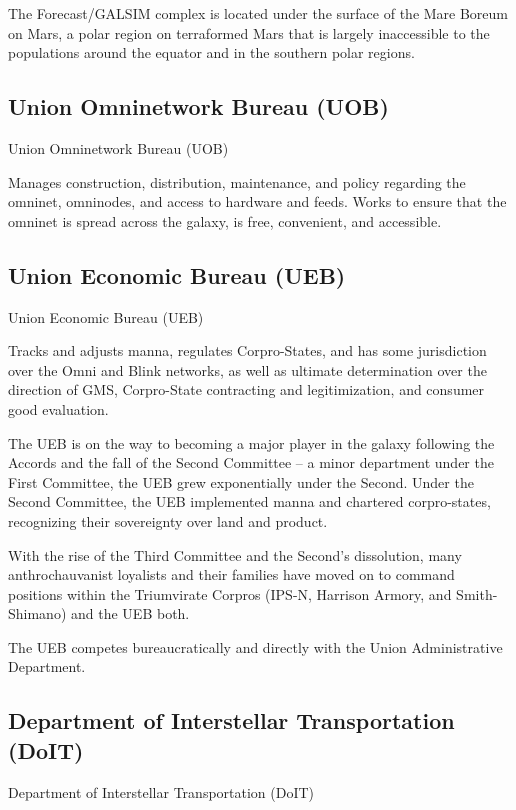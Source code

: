 The Forecast/GALSIM complex is located under the surface of the Mare Boreum on Mars, a  
polar region on terraformed Mars that is largely inaccessible to the populations around the  
equator and in the southern polar regions.  
 
\subsection{Union Omninetwork Bureau (UOB)}
Union Omninetwork Bureau (UOB)   

Manages construction, distribution, maintenance, and policy regarding the omninet, omninodes,  
and access to hardware and feeds. Works to ensure that the omninet is spread across the  
galaxy, is free, convenient, and accessible. 
 
 
\subsection{Union Economic Bureau (UEB) }

Union Economic Bureau (UEB)  

Tracks and adjusts manna, regulates Corpro-States, and has some jurisdiction over the Omni  
and Blink networks, as well as ultimate determination over the direction of GMS, Corpro-State  
contracting and legitimization, and consumer good evaluation.  
 

The UEB is on the way to becoming a major player in the galaxy following the Accords and the  
fall of the Second Committee -- a minor department under the First Committee, the UEB grew  
exponentially under the Second. Under the Second Committee, the UEB implemented manna  
and chartered corpro-states, recognizing their sovereignty over land and product. 
 

With the rise of the Third Committee and the Second’s dissolution, many anthrochauvanist  
loyalists and their families have moved on to command positions within the Triumvirate Corpros  
(IPS-N, Harrison Armory, and Smith-Shimano) and the UEB both. 
 

The UEB competes bureaucratically and directly with the Union Administrative Department.
 
\subsection{Department of Interstellar Transportation (DoIT)}
Department of Interstellar Transportation (DoIT)  

                                                                                                                 


